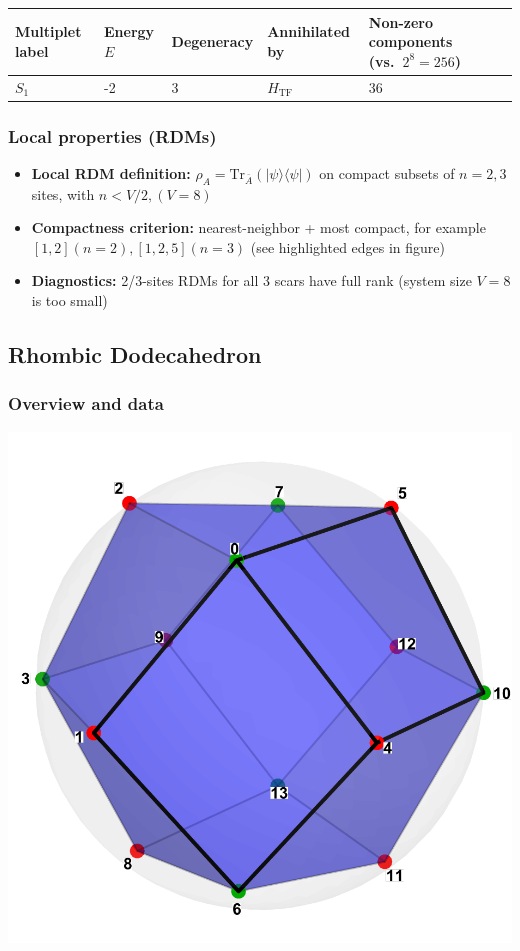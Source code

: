 \documentclass[11pt,a4paper]{article}
\newcommand{\Htf}{H_{\mathrm{TF}}}
\begin{document}
\begin{center}
\begin{tabular}{L{3.5cm} C{2.2cm} C{2.2cm} C{2.2cm} C{3.0cm} C{3.2cm}}
\toprule
\textbf{Multiplet label} & \textbf{Energy $E$} & \textbf{Degeneracy} & \textbf{Annihilated by} & \textbf{Non-zero components (vs.\ $2^{8} = 256$)} \\
\midrule
$S_1$ & -2 & 3 & $\Htf$ & 36\\
\bottomrule
\end{tabular}
\end{center}

\subsubsection*{Local properties (RDMs)}

\begin{itemize}[leftmargin=1.5em]
  \item \textbf{Local RDM definition:} $\rho_A=\mathrm{Tr}_{\bar A}(|\psi\rangle\langle\psi|)$ on compact subsets of $n=2,3$ sites, with $n < V/2, (V=8)$
  \item \textbf{Compactness criterion:} nearest-neighbor + most compact, for example $[1,2] (n = 2), [1,2,5] (n = 3)$ (see highlighted edges in figure)
  \item \textbf{Diagnostics:} 2/3-sites RDMs for all 3 scars have full rank (system size $V=8$ is too small)
\end{itemize}


\subsection*{Rhombic Dodecahedron}

\subsubsection*{Overview and data}
\begin{center}
  \includegraphics[width=.6\linewidth]{rhombicdodecahedron}
\end{center}
\end{document}
